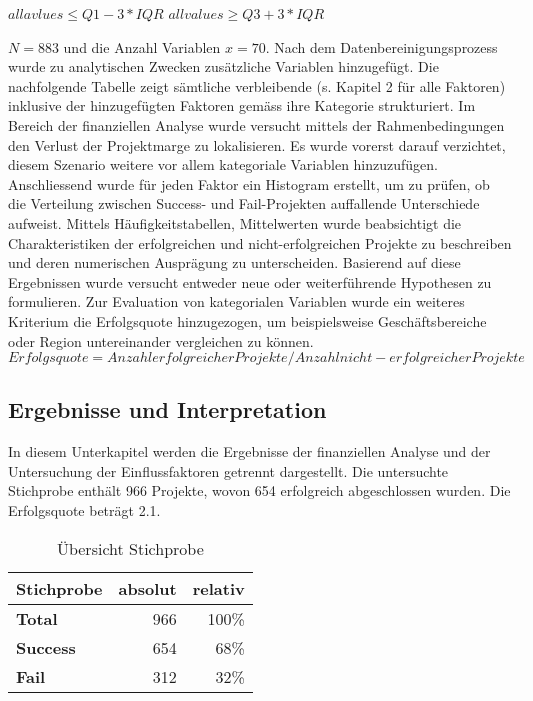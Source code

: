 \begin{centering}
		$ all avlues \leq Q1 - 3 * IQR$
		\newline
		$ all values \geq Q3 + 3 * IQR$
\end{centering}
\newline\newline
 $N = 883 $ und die Anzahl Variablen $ x = 70$.
\newline
Nach dem Datenbereinigungsprozess wurde zu analytischen Zwecken zusätzliche Variablen hinzugefügt. Die nachfolgende Tabelle zeigt sämtliche verbleibende (s. Kapitel 2 für alle Faktoren) inklusive der hinzugefügten Faktoren gemäss ihre Kategorie strukturiert. Im Bereich der finanziellen Analyse wurde versucht mittels der Rahmenbedingungen den Verlust der Projektmarge zu lokalisieren. Es wurde vorerst darauf verzichtet, diesem Szenario weitere vor allem kategoriale Variablen hinzuzufügen. Anschliessend wurde für jeden Faktor ein Histogram erstellt, um zu prüfen, ob die Verteilung zwischen Success- und Fail-Projekten auffallende Unterschiede aufweist. Mittels Häufigkeitstabellen, Mittelwerten wurde beabsichtigt die Charakteristiken der erfolgreichen und nicht-erfolgreichen Projekte zu beschreiben und deren numerischen Ausprägung zu unterscheiden. Basierend auf diese Ergebnissen wurde versucht entweder neue oder weiterführende Hypothesen zu formulieren. Zur Evaluation von kategorialen Variablen wurde ein weiteres Kriterium die Erfolgsquote hinzugezogen, um beispielsweise Geschäftsbereiche oder Region untereinander vergleichen zu können. 
\newline\newline $Erfolgsquote = Anzahl erfolgreicher Projekte/Anzahl nicht-erfolgreicher Projekte$
\newline\newline
\subsection{Ergebnisse und Interpretation}
In diesem Unterkapitel werden die Ergebnisse der finanziellen Analyse und der Untersuchung der Einflussfaktoren getrennt dargestellt. Die untersuchte Stichprobe enthält 966 Projekte, wovon 654 erfolgreich abgeschlossen wurden. Die Erfolgsquote beträgt 2.1.
\begin{table}[htbp]
	\centering
	\caption{Übersicht Stichprobe}
	\begin{tabular} {l|r|r}
		\textbf{Stichprobe} & \textbf{absolut} & \textbf{relativ} \\\hline
		\textbf{Total} & 966 & 100\% \\
		\textbf{Success} & 654 & 68\% \\
		\textbf{Fail} & 312 & 32\% \\
	\end{tabular}
\end{table}
\newpage

